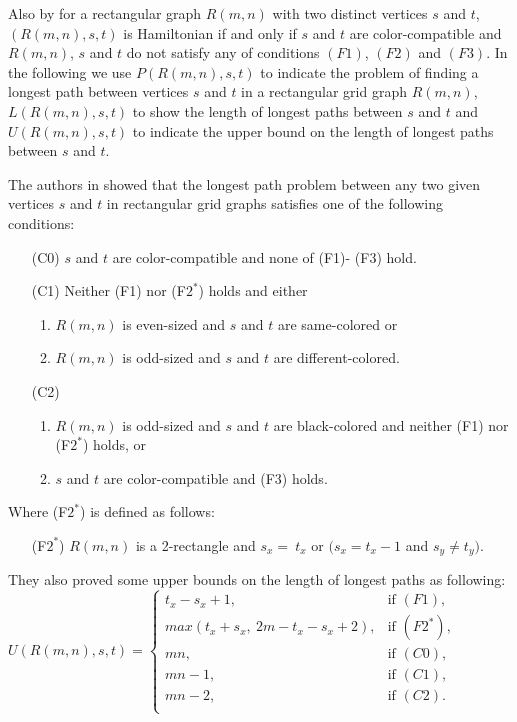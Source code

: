 \documentclass[preprint,12pt]{elsarticle}
\begin{document}
Also by \cite{IPS:HPIGG} for a rectangular graph $R(m,n)$ with two
distinct vertices $s$ and $t$, $(R(m,n),s,t)$ is Hamiltonian if and
only if $s$ and $t$ are color-compatible and $R(m,n)$, $s$ and $t$
do not satisfy any of conditions $(F1)$, $(F2)$ and $(F3)$.
In the following we use $P(R(m,n),s,t)$ to indicate the problem of
finding a longest path between vertices $s$ and $t$ in a rectangular
grid graph $R(m,n)$, $L(R(m,n),s,t)$ to show the length of longest
paths between $s$ and $t$ and $U(R(m,n),s,t)$ to indicate the upper
bound on the length of longest paths between $s$ and $t$.
\par The authors in
\cite{FAA:ALAFFLPIRGG} showed that the longest path problem between
any two given vertices $s$ and $t$ in rectangular grid graphs satisfies one of the
following conditions:
\begin{itemize}
\item [(C0)] $s$ and $t$ are color-compatible and none of (F1)- (F3) hold.
\item [(C1)] Neither (F1) nor (F$2^*$) holds and either
\begin{enumerate}
\item $R(m,n)$ is even-sized and $s$ and $t$ are same-colored or
\item $R(m,n)$ is odd-sized and $s$ and $t$ are different-colored.
\end{enumerate}
\item [(C2)]
\begin{enumerate}
\item $R(m,n)$ is odd-sized and $s$ and $t$ are black-colored and neither (F1) nor (F$2^*$) holds, or
\item $s$ and $t$ are color-compatible and (F3) holds.
\end{enumerate}
\end{itemize}
Where (F$2^*$) is defined as follows:
\begin{itemize}
\item [(F$2^*$)] $R(m,n)$ is a 2-rectangle and $s_{x}=\ t_{x}$ or $( s_{x} = t_{x}-1$ and $s_{y} \neq t_{y})$.
\end{itemize}
They also proved some upper bounds on the length of longest paths as
following:\\ $U(R(m,n),s,t)=
  \begin{cases}
    t_{x}-s_{x}+1,                               & \text{if  $(F1)$,} \\
    max(t_{x}+ s_{x},\ 2m - t_{x}- s_{x}+2), & \text{if $(F2^*)$,} \\
    mn, &           \text{if $(C0)$,}\\
    m n -1, &         \text{if $(C1)$,} \\
    mn-2, &         \text{if $(C2)$.}\\
  \end{cases}$
\end{document}
